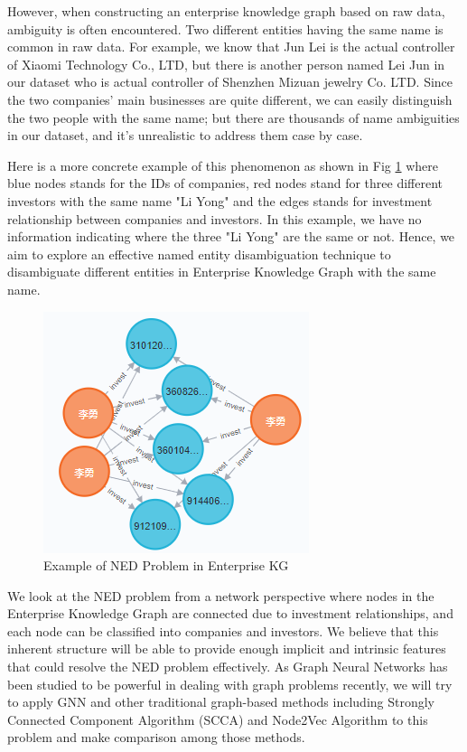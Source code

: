 \documentclass[sigconf, nonacm]{acmart}
\begin{document}
However, when constructing an enterprise knowledge graph based on raw data, ambiguity is often encountered. Two different entities having the same name is common in raw data. For example, we know that Jun Lei is the actual controller of Xiaomi Technology Co., LTD, but there is another person named Lei Jun in our dataset who is actual controller of Shenzhen Mizuan jewelry Co. LTD. Since the two companies' main businesses are quite different, we can easily distinguish the two people with the same name; but there are thousands of name ambiguities in our dataset, and it's unrealistic to address them case by case. 

Here is a more concrete example of this phenomenon as shown in Fig \ref{fig:example} where blue nodes stands for the IDs of companies, red nodes stand for three different investors with the same name "Li Yong" and the edges stands for investment relationship between companies and investors. In this example, we have no information indicating where the three "Li Yong" are the same or not. Hence, we aim to explore an effective named entity disambiguation technique to disambiguate different entities in Enterprise Knowledge Graph with the same name. 

\begin{figure}[htbp]
    \centering
    \includegraphics[scale = 0.6]{figures/dis.png}
    \caption{Example of NED Problem in Enterprise KG}
    \label{fig:example}
\end{figure}

We look at the NED problem from a network perspective where nodes in the Enterprise Knowledge Graph are connected due to investment relationships, and each node can be classified into companies and investors. We believe that this inherent structure will be able to provide enough implicit and intrinsic features that could resolve the NED problem effectively. As Graph Neural Networks has been studied to be powerful in dealing with graph problems recently, we will try to apply GNN and other traditional graph-based methods including Strongly Connected Component Algorithm (SCCA) and Node2Vec Algorithm to this problem and make comparison among those methods.
\end{document}
